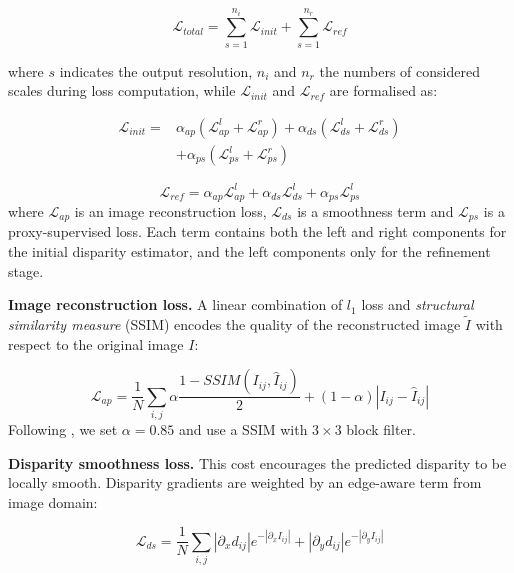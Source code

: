 \documentclass[10pt,twocolumn,letterpaper]{article}
\begin{document}
\begin{equation} \label{eq:total_loss}
  \mathcal{L}_{total} = \sum_{s=1}^{n_i} \mathcal{L}_{init} + \sum_{s=1}^{n_r} \mathcal{L}_{ref}
\end{equation}

where $s$ indicates the output resolution, $n_i$ and $n_r$ the numbers of considered scales during loss computation, while $\mathcal{L}_{init}$ and $\mathcal{L}_{ref}$ are formalised as:

\begin{equation} \label{eq:initial_loss}
\begin{split}
	\mathcal{L}_{init} = & \alpha_{ap} (\mathcal{L}_{ap}^l + \mathcal{L}_{ap}^r) + \alpha_{ds} (\mathcal{L}_{ds}^l  + \mathcal{L}_{ds}^r)\\ 
	& + \alpha_{ps} (\mathcal{L}_{ps}^l + \mathcal{L}_{ps}^r)
\end{split}
\end{equation}


\begin{equation} \label{eq:initial_refined}
	\mathcal{L}_{ref} = \alpha_{ap} \mathcal{L}_{ap}^l + \alpha_{ds} \mathcal{L}_{ds}^l + \alpha_{ps} \mathcal{L}_{ps}^l
\end{equation} 
where $\mathcal{L}_{ap}$ is an image reconstruction loss, $\mathcal{L}_{ds}$ is a smoothness term and $\mathcal{L}_{ps}$ is a proxy-supervised loss. Each term contains both the left and right components for the initial disparity estimator, and the left components only for the refinement stage.

\smallskip
\textbf{Image reconstruction loss.}
A linear combination of $l_{1}$ loss and \textit{structural similarity measure} (SSIM) \cite{SSIM} encodes the quality of the reconstructed image $\tilde{I}$ with respect to the original image $I$:

\begin{equation} \label{eq:image_rec}
	\mathcal{L}_{ap} = \frac{1}{N}\sum_{i,j}\alpha \frac{1-SSIM(I_{ij},\hat{I}_{ij})}{2} +  (1-\alpha) |I_{ij}-\hat{I}_{ij}|
\end{equation} 
Following \cite{monodepth17}, we set $\alpha = 0.85$  and use a SSIM with $3 \times 3$ block filter.


\smallskip
\textbf{Disparity smoothness loss.}
This cost encourages the predicted disparity to be locally smooth. Disparity gradients are weighted by an edge-aware term from image domain:

\begin{equation}\label{eq:smooth}
\mathcal{L}_{ds} = \frac{1}{N} \sum_{i,j}|\partial_{x} d_{ij}| e^{-|\partial_{x}I_{ij} |} + |\partial_{y} d_{ij}| e^{-|\partial_{y}I_{ij}|}
\end{equation} 
\smallskip
\end{document}
